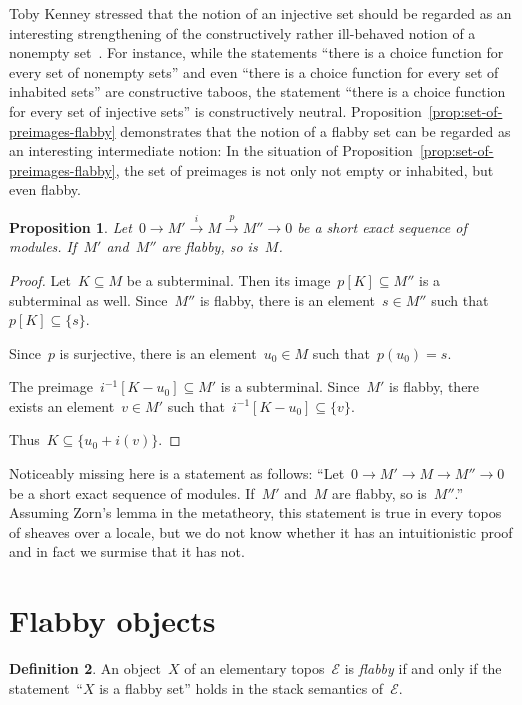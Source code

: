 \documentclass[oneside]{amsart}
\theoremstyle{definition}
\newtheorem{defn}{Definition}[section]
\theoremstyle{plain}
\newtheorem{prop}[defn]{Proposition}
\theoremstyle{remark}
\newcommand{\xra}[1]{\xrightarrow{#1}}
\newcommand{\E}{\mathcal{E}}
\renewcommand{\_}{\mathpunct{.}\,}
\begin{document}
Toby Kenney stressed that the notion of an injective set should be regarded as an
interesting strengthening of the constructively rather ill-behaved notion of a
nonempty set~\cite{kenney:injective-choice}. For instance, while the statements
``there is a choice function for every set of nonempty sets'' and even ``there
is a choice function for every set of inhabited sets'' are constructive taboos,
the statement ``there is a choice function for every set of injective sets'' is
constructively neutral. Proposition~\ref{prop:set-of-preimages-flabby} demonstrates
that the notion of a flabby set can be regarded as an interesting intermediate
notion: In the situation of Proposition~\ref{prop:set-of-preimages-flabby}, the
set of preimages is not only not empty or inhabited, but even flabby.

\begin{prop}Let~$0 \to M' \xra{i} M \xra{p} M'' \to 0$ be a short exact
sequence of modules. If~$M'$ and~$M''$ are flabby, so is~$M$.
\end{prop}

\begin{proof}Let~$K \subseteq M$ be a subterminal. Then its image~$p[K] \subseteq M''$
is a subterminal as well. Since~$M''$ is flabby, there is an element~$s \in
M''$ such that~$p[K] \subseteq \{ s \}$.

Since~$p$ is surjective, there is an element~$u_0 \in M$ such that~$p(u_0) =
s$.

The preimage~$i^{-1}[K - u_0] \subseteq M'$ is a subterminal. Since~$M'$ is
flabby, there exists an element~$v \in M'$ such that~$i^{-1}[K - u_0] \subseteq
\{v\}$.

Thus~$K \subseteq \{ u_0 + i(v) \}$.
\end{proof}

Noticeably missing here is a statement as follows: ``Let~$0 \to M' \to M \to
M'' \to 0$ be a short exact sequence of modules. If~$M'$ and~$M$ are flabby, so
is~$M''$.'' Assuming Zorn's lemma in the metatheory, this statement is true in
every topos of sheaves over a locale, but we do not know whether it has an
intuitionistic proof and in fact we surmise that it has not.


\section{Flabby objects}
\label{sect:flabby-objects}

\begin{defn}An object~$X$ of an elementary topos~$\E$ is \emph{flabby} if and
only if the statement~``$X$ is a flabby set'' holds in the stack semantics
of~$\E$.\end{defn}
\end{document}
